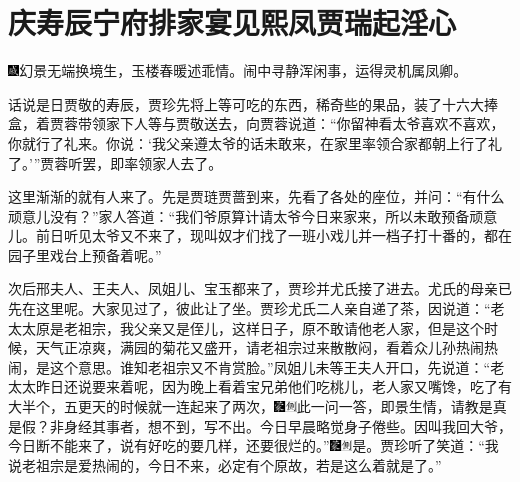 

\chapter{庆寿辰宁府排家宴\hspace{.5em}见熙凤贾瑞起淫心}

{\includegraphics[width=3mm]{../Images/00005}幻景无端换境生，玉楼春暖述乖情。闹中寻静浑闲事，运得灵机属凤卿。}

话说是日贾敬的寿辰，贾珍先将上等可吃的东西，稀奇些的果品，装了十六大捧盒，着贾蓉带领家下人等与贾敬送去，向贾蓉说道：``你留神看太爷喜欢不喜欢，你就行了礼来。你说：`我父亲遵太爷的话未敢来，在家里率领合家都朝上行了礼了。'''贾蓉听罢，即率领家人去了。

这里渐渐的就有人来了。先是贾琏贾蔷到来，先看了各处的座位，并问：``有什么顽意儿没有？''家人答道：``我们爷原算计请太爷今日来家来，所以未敢预备顽意儿。前日听见太爷又不来了，现叫奴才们找了一班小戏儿并一档子打十番的，都在园子里戏台上预备着呢。''

次后邢夫人、王夫人、凤姐儿、宝玉都来了，贾珍并尤氏接了进去。尤氏的母亲已先在这里呢。大家见过了，彼此让了坐。贾珍尤氏二人亲自递了茶，因说道：``老太太原是老祖宗，我父亲又是侄儿，这样日子，原不敢请他老人家，但是这个时候，天气正凉爽，满园的菊花又盛开，请老祖宗过来散散闷，看着众儿孙热闹热闹，是这个意思。谁知老祖宗又不肯赏脸。''凤姐儿未等王夫人开口，先说道：``老太太昨日还说要来着呢，因为晚上看着宝兄弟他们吃桃儿，老人家又嘴馋，吃了有大半个，五更天的时候就一连起来了两次，{\includegraphics[width=3mm]{../Images/00006}\includegraphics[width=3mm]{../Images/00011}\footnotesize \kaishu 此一问一答，即景生情，请教是真是假？非身经其事者，想不到，写不出。}今日早晨略觉身子倦些。因叫我回大爷，今日断不能来了，说有好吃的要几样，还要很烂的。''{\includegraphics[width=3mm]{../Images/00006}\includegraphics[width=3mm]{../Images/00011}\footnotesize \kaishu 是。}贾珍听了笑道：``我说老祖宗是爱热闹的，今日不来，必定有个原故，若是这么着就是了。''

